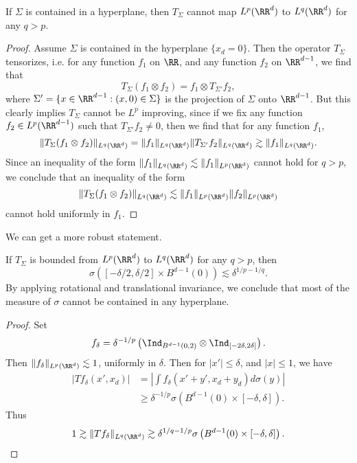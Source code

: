 \begin{theorem}
    If $\Sigma$ is contained in a hyperplane, then $T_\Sigma$ cannot map $L^p(\RR^d)$ to $L^q(\RR^d)$ for any $q > p$. 
\end{theorem}
\begin{proof}
    Assume $\Sigma$ is contained in the hyperplane $\{ x_d = 0 \}$. Then the operator $T_\Sigma$ tensorizes, i.e. for any function $f_1$ on $\RR$, and any function $f_2$ on $\RR^{d-1}$, we find that
    \[ T_\Sigma(f_1 \otimes f_2) = f_1 \otimes T_{\Sigma'} f_2, \]
    where $\Sigma' = \{ x \in \RR^{d-1} : (x,0) \in \Sigma \}$ is the projection of $\Sigma$ onto $\RR^{d-1}$. But this clearly implies $T_\Sigma$ cannot be $L^p$ improving, since if we fix any function $f_2 \in L^p(\RR^{d-1})$ such that $T_{\Sigma'} f_2 \neq 0$, then we find that for any function $f_1$,
    \[ \| T_\Sigma (f_1 \otimes f_2) \|_{L^q(\RR^d)} = \| f_1 \|_{L^q(\RR^d)} \| T_{\Sigma'} f_2 \|_{L^q(\RR^d)} \gtrsim \| f_1 \|_{L^q(\RR^d)}. \]
    Since an inequality of the form $\| f_1 \|_{L^q(\RR^d)} \lesssim \| f_1 \|_{L^p(\RR^d)}$ cannot hold for $q > p$, we conclude that an inequality of the form
    \[ \| T_\Sigma (f_1 \otimes f_2) \|_{L^q(\RR^d)} \lesssim \| f_1 \|_{L^p(\RR^d)} \| f_2 \|_{L^p(\RR^d)} \]
    cannot hold uniformly in $f_1$.
\end{proof}

We can get a more robust statement.

\begin{theorem}
    If $T_\Sigma$ is bounded from $L^p(\RR^d)$ to $L^q(\RR^d)$ for any $q > p$, then
    \[ \sigma \left( [-\delta/2, \delta/2] \times B^{d-1}(0) \right) \lesssim \delta^{1/p - 1/q}. \]
    By applying rotational and translational invariance, we conclude that most of the measure of $\sigma$ cannot be contained in any hyperplane.
\end{theorem}
\begin{proof}
    Set
    \[ f_\delta = \delta^{-1/p} \left( \Ind_{B^{d-1}(0, 2)} \otimes \Ind_{[-2\delta,2\delta]} \right). \]
    Then $\| f_\delta \|_{L^p(\RR^d)} \lesssim 1$, uniformly in $\delta$. Then for $|x'| \leq \delta$, and $|x| \leq 1$, we have
    \begin{align*}
        |Tf_\delta(x',x_d)| &= \left| \int f_\delta(x'+y',x_d + y_d) d\sigma(y) \right|\\
        &\geq \delta^{-1/p} \sigma \left( B^{d-1}(0) \times [-\delta,\delta] \right).
    \end{align*}
    Thus
    \[ 1 \gtrsim \| Tf_\delta \|_{L^q(\RR^d)} \gtrsim \delta^{1/q-1/p} \sigma \left( B^{d-1}(0) \times [-\delta,\delta] \right). \qedhere \]
\end{proof}

